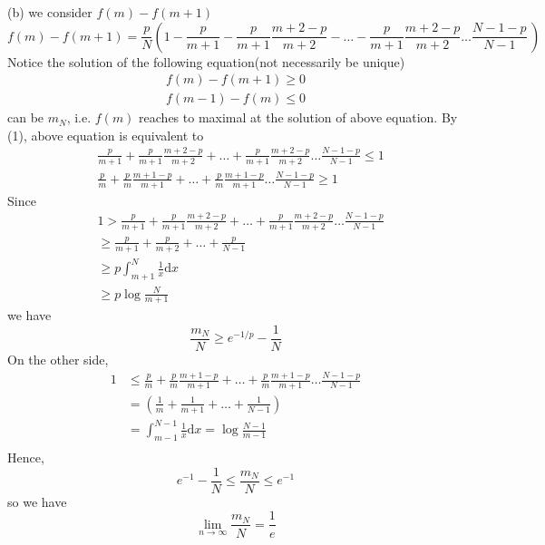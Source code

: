 \documentclass[a4paper,12pt]{article}
\newenvironment{prooff}{{\noindent\it\textcolor{cyan!40!black}{Proof}:}\quad}{\par}
\begin{document}
\begin{prooff}
    (b)  we consider $f(m)-f(m+1)$
    \begin{equation}
        f(m)-f(m+1)=\frac{p}{N}(1-\frac{p}{m+1}-\frac{p}{m+1}\frac{m+2-p}{m+2}-\dots-\frac{p}{m+1}\frac{m+2-p}{m+2}\dots \frac{N-1-p}{N-1}\, )
    \end{equation}
    Notice the solution of the following equation(not necessarily be unique)
    \begin{align*}
        f(m)-f(m+1)\ge 0 \\
        f(m-1)-f(m)\le 0
    \end{align*}
    can be $m_N$, i.e. $f(m)$ reaches to maximal at the solution of above equation.
    By (1), above equation is equivalent to
    \begin{align*}
         & \frac{p}{m+1}+\frac{p}{m+1}\frac{m+2-p}{m+2}+\dots+\frac{p}{m+1}\frac{m+2-p}{m+2}\dots \frac{N-1-p}{N-1} \le 1 \\
         & \frac{p}{m}+\frac{p}{m}\frac{m+1-p}{m+1}+\dots+\frac{p}{m}\frac{m+1-p}{m+1}\dots \frac{N-1-p}{N-1} \ge 1
    \end{align*}
    Since
    \begin{align*}
         & 1>\frac{p}{m+1}+\frac{p}{m+1}\frac{m+2-p}{m+2}+\dots+\frac{p}{m+1}\frac{m+2-p}{m+2}\dots \frac{N-1-p}{N-1} \\
         & \ge  \frac{p}{m+1}+\frac{p}{m+2}+\dots +\frac{p}{N-1}                                                      \\
         & \ge p\int_{m+1}^N\frac{1}{x}\text{d}x                                                                      \\
         & \ge p \log \frac{N}{m+1}
    \end{align*}
    we have
    \begin{equation*}
        \frac{m_N}{N}\ge e^{-1/p}-\frac{1}{N}
    \end{equation*}
    On the other side,
    \begin{align*}
        1 & \le \frac{p}{m}+\frac{p}{m}\frac{m+1-p}{m+1}+\dots+\frac{p}{m}\frac{m+1-p}{m+1}\dots \frac{N-1-p}{N-1} \\
          & =(\frac{1}{m}+\frac{1}{m+1}+\dots +\frac{1}{N-1})                                                      \\
          & =\int_{m-1}^{N-1}\frac{1}{x}\text{d}x=\log \frac{N-1}{m-1}                                             \\
    \end{align*}
    Hence,
    \begin{equation*}
        e^{-1}-\frac{1}{N}\le \frac{m_N}{N}\le e^{-1}
    \end{equation*}
    so we have
    \begin{equation*}
        \lim_{n\to \infty}\frac{m_N}{N}=\frac{1}{e}
    \end{equation*}


\end{prooff}
\end{document}

